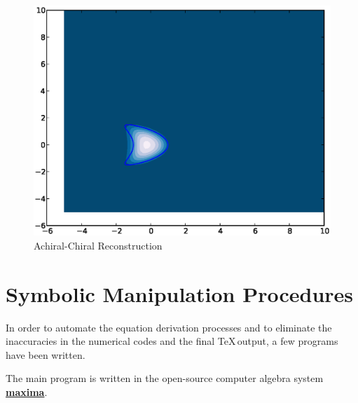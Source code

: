 \begin{figure}
\centering
  \includegraphics[scale=0.6]{src/data/achiral_chiral_TM.eps}
  \caption{Achiral-Chiral Reconstruction}  
\label{fig:a-c-tm}
\end{figure}

\appendix

\chapter{Symbolic Manipulation Procedures}

In order to automate the equation derivation processes and to eliminate the inaccuracies in the numerical codes and the final \TeX\,output, a few programs have been written. 

The main program is written in the open-source computer algebra system \href{http://maxima.sourceforge.net/}{\textbf{maxima}}. 

%
%
%

\nocite{*}




